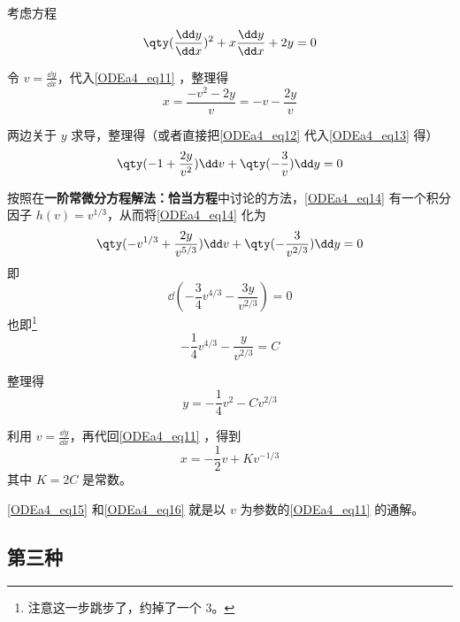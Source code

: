\begin{example}{}
考虑方程
\begin{equation}\label{ODEa4_eq11}
\qty(\frac{\dd y}{\dd x})^2+x\frac{\dd y}{\dd x}+2y=0
\end{equation}

令 $v=\frac{\dd y}{\dd x}$，代入\autoref{ODEa4_eq11} ，整理得
\begin{equation}\label{ODEa4_eq12}
x=\frac{-v^2-2y}{v}=-v-\frac{2y}{v}
\end{equation}



两边关于 $y$ 求导，整理得（或者直接把\autoref{ODEa4_eq12} 代入\autoref{ODEa4_eq13} 得）
\begin{equation}\label{ODEa4_eq14}
\qty(-1+\frac{2y}{v^2})\dd v+\qty(-\frac{3}{v})\dd y=0
\end{equation}

按照在\textbf{一阶常微分方程解法：恰当方程}中讨论的方法，\autoref{ODEa4_eq14} 有一个积分因子 $h(v)=v^{1/3}$，从而将\autoref{ODEa4_eq14} 化为
\begin{equation}
\qty(-v^{1/3}+\frac{2y}{v^{5/3}})\dd v+\qty(-\frac{3}{v^{2/3}})\dd y=0
\end{equation}
即
\begin{equation}
\dd (-\frac{3}{4}v^{4/3}-\frac{3y}{v^{2/3}})=0
\end{equation}
也即\footnote{注意这一步跳步了，约掉了一个 $3$。}
\begin{equation}
-\frac{1}{4}v^{4/3}-\frac{y}{v^{2/3}}=C
\end{equation}

整理得
\begin{equation}\label{ODEa4_eq15}
y=-\frac{1}{4}v^2-Cv^{2/3}
\end{equation}

利用 $v=\frac{\dd y}{\dd x}$，再代回\autoref{ODEa4_eq11} ，得到
\begin{equation}\label{ODEa4_eq16}
x=-\frac{1}{2}v+Kv^{-1/3}
\end{equation}
其中 $K=2C$ 是常数。

\autoref{ODEa4_eq15} 和\autoref{ODEa4_eq16} 就是以 $v$ 为参数的\autoref{ODEa4_eq11} 的通解。



\end{example}



\subsection{第三种}

